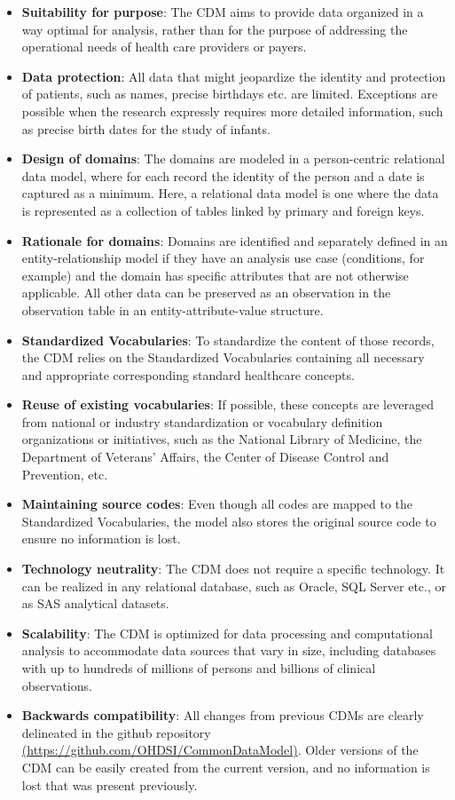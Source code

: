 \documentclass[11pt]{book}
\providecommand{\tightlist}{%
  \setlength{\itemsep}{0pt}\setlength{\parskip}{0pt}}
\theoremstyle{definition}
\theoremstyle{definition}
\theoremstyle{definition}
\theoremstyle{remark}
\begin{document}
\begin{itemize}
\tightlist
\item
  \textbf{Suitability for purpose}: The CDM aims to provide data organized in a way optimal for analysis, rather than for the purpose of addressing the operational needs of health care providers or payers.
\item
  \textbf{Data protection}: All data that might jeopardize the identity and protection of patients, such as names, precise birthdays etc. are limited. Exceptions are possible when the research expressly requires more detailed information, such as precise birth dates for the study of infants.
\item
  \textbf{Design of domains}: The domains are modeled in a person-centric relational data model, where for each record the identity of the person and a date is captured as a minimum. Here, a relational data model is one where the data is represented as a collection of tables linked by primary and foreign keys.
\item
  \textbf{Rationale for domains}: Domains are identified and separately defined in an entity-relationship model if they have an analysis use case (conditions, for example) and the domain has specific attributes that are not otherwise applicable. All other data can be preserved as an observation in the observation table in an entity-attribute-value structure.
\item
  \textbf{Standardized Vocabularies}: To standardize the content of those records, the CDM relies on the Standardized Vocabularies containing all necessary and appropriate corresponding standard healthcare concepts.
\item
  \textbf{Reuse of existing vocabularies}: If possible, these concepts are leveraged from national or industry standardization or vocabulary definition organizations or initiatives, such as the National Library of Medicine, the Department of Veterans' Affairs, the Center of Disease Control and Prevention, etc.
\item
  \textbf{Maintaining source codes}: Even though all codes are mapped to the Standardized Vocabularies, the model also stores the original source code to ensure no information is lost.
\item
  \textbf{Technology neutrality}: The CDM does not require a specific technology. It can be realized in any relational database, such as Oracle, SQL Server etc., or as SAS analytical datasets.
\item
  \textbf{Scalability}: The CDM is optimized for data processing and computational analysis to accommodate data sources that vary in size, including databases with up to hundreds of millions of persons and billions of clinical observations.
\item
  \textbf{Backwards compatibility}: All changes from previous CDMs are clearly delineated in the github repository \href{https://github.com/OHDSI/CommonDataModel}{(https://github.com/OHDSI/CommonDataModel)}. Older versions of the CDM can be easily created from the current version, and no information is lost that was present previously.
\end{itemize}
\end{document}
